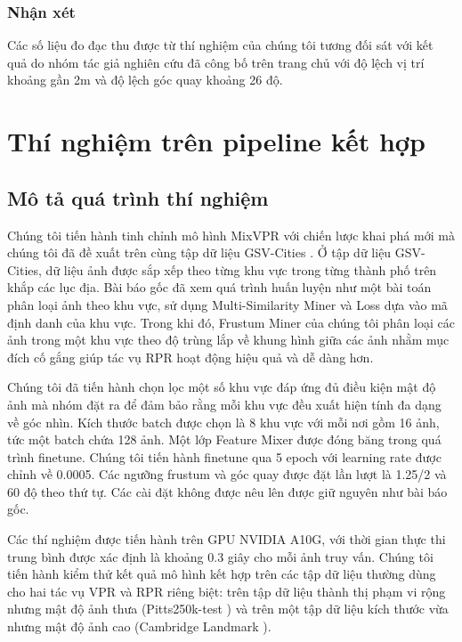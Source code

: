 \subsubsection*{Nhận xét}

Các số liệu đo đạc thu được từ thí nghiệm của chúng tôi tương đối sát với kết quả do nhóm tác giả nghiên cứu đã công bố trên trang chủ với độ lệch vị trí khoảng gần 2m và độ lệch góc quay khoảng 26 độ.

\section{Thí nghiệm trên pipeline kết hợp}
\subsection*{Mô tả quá trình thí nghiệm}

Chúng tôi tiến hành tinh chỉnh mô hình MixVPR \cite{alibey2023mixvpr} với chiến lược khai phá mới mà chúng tôi đã đề xuất trên cùng tập dữ liệu GSV-Cities \cite{Ali_bey_2022}. Ở tập dữ liệu GSV-Cities, dữ liệu ảnh được sắp xếp theo từng khu vực trong từng thành phố trên khắp các lục địa. Bài báo gốc đã xem quá trình huấn luyện như một bài toán phân loại ảnh theo khu vực, sử dụng Multi-Similarity Miner và Loss \cite{wang2019multi} dựa vào mã định danh của khu vực. Trong khi đó, Frustum Miner của chúng tôi phân loại các ảnh trong một khu vực theo độ trùng lắp về khung hình giữa các ảnh nhằm mục đích cố gắng giúp tác vụ RPR hoạt động hiệu quả và dễ dàng hơn.

Chúng tôi đã tiến hành chọn lọc một số khu vực đáp ứng đủ điều kiện mật độ ảnh mà nhóm đặt ra để đảm bảo rằng mỗi khu vực đều xuất hiện tính đa dạng về góc nhìn. Kích thước batch được chọn là 8 khu vực với mỗi nơi gồm 16 ảnh, tức một batch chứa 128 ảnh. Một lớp Feature Mixer được đóng băng trong quá trình finetune. Chúng tôi tiến hành finetune qua 5 epoch với learning rate được chỉnh về 0.0005. Các ngưỡng frustum và góc quay được đặt lần lượt là 1.25/2 và 60 độ theo thứ tự. Các cài đặt không được nêu lên được giữ nguyên như bài báo gốc.

Các thí nghiệm được tiến hành trên GPU NVIDIA A10G, với thời gian thực thi trung bình được xác định là khoảng 0.3 giây cho mỗi ảnh truy vấn. Chúng tôi tiến hành kiểm thử kết quả mô hình kết hợp trên các tập dữ liệu thường dùng cho hai tác vụ VPR và RPR riêng biệt: trên tập dữ liệu thành thị phạm vi rộng nhưng mật độ ảnh thưa (Pitts250k-test \cite{6618963}) và trên một tập dữ liệu kích thước vừa nhưng mật độ ảnh cao (Cambridge Landmark \cite{kendall2016posenet}). 


